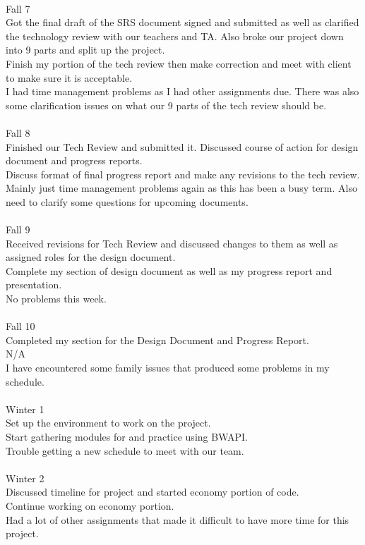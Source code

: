 \\
Fall 7\\
Got the final draft of the SRS document signed and submitted as well as clarified the technology review with our teachers and TA. Also broke our project down into 9 parts and split up the project.\\ Finish my portion of the tech review then make correction and meet with client to make sure it is acceptable.\\ I had time management problems as I had other assignments due. There was also some clarification issues on what our 9 parts of the tech review should be.\\
\\
Fall 8\\
Finished our Tech Review and submitted it. Discussed course of action for design document and progress reports.\\ Discuss format of final progress report and make any revisions to the tech review.\\ Mainly just time management problems again as this has been a busy term. Also need to clarify some questions for upcoming documents.\\
\\
Fall 9\\
Received revisions for Tech Review and discussed changes to them as well as assigned roles for the design document.\\ Complete my section of design document as well as my progress report and presentation.\\ No problems this week.\\
\\
Fall 10\\
Completed my section for the Design Document and Progress Report.\\ N/A\\ I have encountered some family issues that produced some problems in my schedule.\\
\\
Winter 1\\
Set up the environment to work on the project.\\ Start gathering modules for and practice using BWAPI.\\ Trouble getting a new schedule to meet with our team.\\
\\
Winter 2\\
Discussed timeline for project and started economy portion of code.\\ Continue working on economy portion.\\ Had a lot of other assignments that made it difficult to have more time for this project.\\
